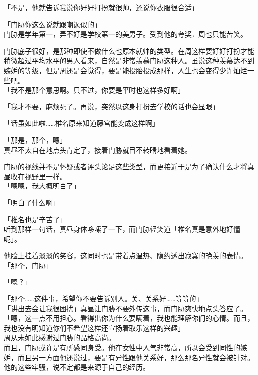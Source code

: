 「不是，他就告诉我说你好好打扮就很帅，还说你衣服很合适」

「门胁你这么说就跟嘲讽似的」\\

门胁是学年第一，弄不好是学校第一的美男子。受到他的夸奖，周也只能苦笑。

门胁底子很好，是那种即使不做什么也原本就帅的类型。在周这样要好好打扮才能稍微超过平均水平的男人看来，自然是非常羡慕门胁这种人。虽说这种羡慕达不到嫉妒的等级，但是周还是会觉得，要是能投胎投成那样，人生也会变得少许灿烂一些吧。\\

「我不是那个意思啊。只不过，你要是平时也这样多好啊」

「我才不要，麻烦死了。再说，突然以这身打扮去学校的话也会显眼」

「话虽如此啦……椎名原来知道藤宫能变成这样啊」

「那是，那个，嗯」\\

真昼不太自在地点头肯定了，接着门胁就目不转睛地看着她。

门胁的视线并不是怀疑或者评头论足这些类型，而更接近于是为了确认什么才将真昼收在视野里一样。\\

「嗯嗯，我大概明白了」

「明白了什么啊」

「椎名也是辛苦了」\\

听到那样一句话，真昼身体哆嗦了一下，而门胁轻笑道「椎名真是意外地好懂呢」。

他脸上挂着淡淡的笑容，这同时也是带着点温热、隐约透出寂寞的艳羡的表情。\\

「那个，门胁」

「嗯？」

「那个……这件事，希望你不要告诉别人。关、关系好……等等的」\\

「讲出去会让我很困扰」真昼让门胁不要外传这事，而门胁爽快地点头答应了。\\

「嗯，这一点不用担心。看得出你为什么要瞒着，我也能理解你们的心情。而且，我也没有明知道你们不希望这样还宣扬着取乐这样的兴趣」\\

周从未如此感谢过门胁的品格高尚。\\

而且，门胁或许是有所感同身受。他在女性中人气非常高，所以会受到同性的嫉妒，而且另一方面他还说过，要是有异性跟他关系好，那么那名异性就会被针对。他的这些牢骚，说不定都是来源于自己的经历。\\

